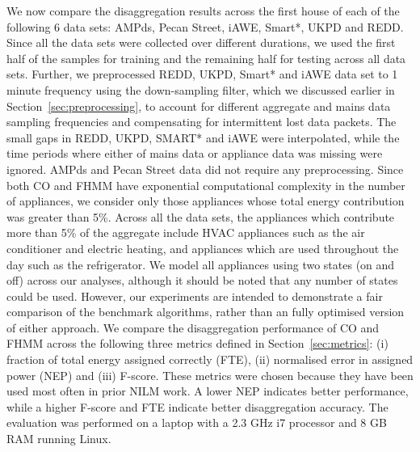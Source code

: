 \documentclass{sig-alternate}
\newcommand{\bluecolor}[1]{\textcolor{blue}{#1}}
\newcommand{\secref}[1]{Section~\ref{#1}}
\begin{document}
\noindent
We now compare the disaggregation results across the first house of each of the following 6 data sets: AMPds, Pecan Street, iAWE, Smart*, UKPD and REDD. Since all the data sets were collected over different durations, we used the first half of the samples for training and the remaining half for testing across all data sets. Further, we preprocessed  REDD, UKPD, Smart* and iAWE data set to 1 minute frequency using the down-sampling filter, which we discussed earlier in \secref{sec:preprocessing}, to account for different aggregate and mains data sampling frequencies and compensating for intermittent lost data packets. The small gaps in REDD, UKPD, SMART* and iAWE were interpolated, while the time periods where either of mains data or appliance data was missing were ignored. AMPds and Pecan Street data did not require any preprocessing. 
Since both CO and FHMM have exponential computational complexity in the number of appliances, we consider only those appliances whose total energy contribution was greater than 5\%. Across all the data sets, the appliances which contribute more than 5\% of the aggregate include HVAC appliances such as the air conditioner and electric heating, and appliances which are used throughout the day such as the refrigerator. We model all appliances using two states (on and off) across our analyses, although it should be noted that any number of states could be used. However, our experiments are intended to demonstrate a fair comparison of the benchmark algorithms, rather than an fully optimised version of either approach.
We compare the disaggregation performance of CO and FHMM across the following three metrics defined in \secref{sec:metrics}: (i) fraction of total energy assigned correctly (FTE), (ii) normalised error in assigned power (NEP) and (iii) F-score. These metrics were chosen because they have been used most often in prior NILM work. A lower NEP indicates better performance, while a higher F-score and FTE indicate better disaggregation accuracy. The evaluation was performed on a laptop with a 2.3 GHz i7 processor and 8 GB RAM running Linux.
\end{document}
